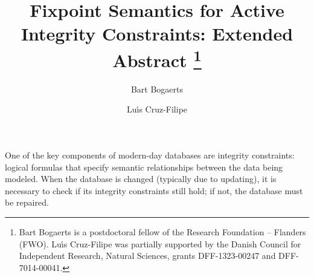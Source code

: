 \documentclass[runningheads]{llncs}
\begin{document}
%
\title{Fixpoint Semantics for Active Integrity Constraints: Extended Abstract \thanks{Bart Bogaerts is a postdoctoral fellow of the Research Foundation -- Flanders (FWO).
Lu\'\i s Cruz-Filipe was partially supported by the Danish Council for Independent Research, Natural Sciences, grants DFF-1323-00247 and DFF-7014-00041.}}
%
%
\author{Bart Bogaerts \and
Lu\'\i s Cruz-Filipe }
%
%
%
\maketitle              %
% 
%
%
%


One of the key components of modern-day databases are integrity constraints: logical formulas that specify semantic relationships between the data being modeled.
When the database is changed (typically due to updating), it is necessary to check if its integrity constraints still hold; if not, the database must be repaired.
\end{document}
